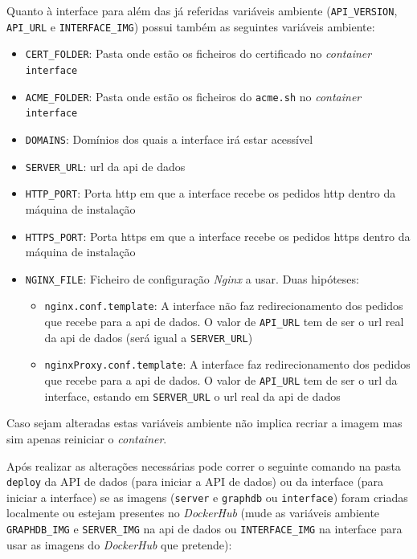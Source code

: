 Quanto à interface para além das já referidas variáveis ambiente (\texttt{API\_VERSION}, \texttt{API\_URL} e \texttt{INTERFACE\_IMG}) possui também as seguintes variáveis ambiente:
\begin{itemize}
    \item \texttt{CERT\_FOLDER}: Pasta onde estão os ficheiros do certificado no \textit{container} \texttt{interface}
    \item \texttt{ACME\_FOLDER}: Pasta onde estão os ficheiros do \texttt{acme.sh} no \textit{container} \texttt{interface}
    \item \texttt{DOMAINS}: Domínios dos quais a interface irá estar acessível
    \item \texttt{SERVER\_URL}: \acrshort{url} da \acrshort{api} de dados
    \item \texttt{HTTP\_PORT}: Porta \acrshort{http} em que a interface recebe os pedidos \acrshort{http} dentro da máquina de instalação
    \item \texttt{HTTPS\_PORT}: Porta \acrshort{https} em que a interface recebe os pedidos \acrshort{https} dentro da máquina de instalação   
    \item \texttt{NGINX\_FILE}: Ficheiro de configuração \textit{Nginx} a usar. Duas hipóteses:
    \begin{itemize}
        \item \texttt{nginx.conf.template}: A interface não faz redirecionamento dos pedidos que recebe para a \acrshort{api} de dados. O valor de \texttt{API\_URL} tem de ser o \acrshort{url} real da \acrshort{api} de dados (será igual a \texttt{SERVER\_URL})
        \item \texttt{nginxProxy.conf.template}: A interface faz redirecionamento dos pedidos que recebe para a \acrshort{api} de dados. O valor de \texttt{API\_URL} tem de ser o \acrshort{url} da interface, estando em \texttt{SERVER\_URL} o \acrshort{url} real da \acrshort{api} de dados
    \end{itemize}
\end{itemize}
Caso sejam alteradas estas variáveis ambiente não implica recriar a imagem mas sim apenas reiniciar o \textit{container}.

Após realizar as alterações necessárias pode correr o seguinte comando na pasta \texttt{deploy} da API de dados (para iniciar a API de dados) ou da interface (para iniciar a interface) se as imagens (\texttt{server} e \texttt{graphdb} ou \texttt{interface}) foram criadas localmente ou estejam presentes no \textit{DockerHub} (mude as variáveis ambiente \texttt{GRAPHDB\_IMG} e \texttt{SERVER\_IMG} na \acrshort{api} de dados ou \texttt{INTERFACE\_IMG} na interface para usar as imagens do \textit{DockerHub} que pretende):


